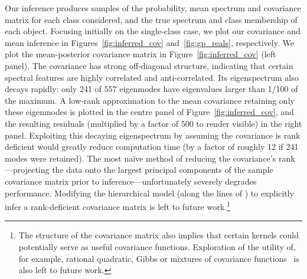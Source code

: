\documentclass[a4paper,fleqn,usenatbib]{mnras}
\begin{document}
Our inference produces samples of the probability, mean spectrum and covariance matrix for each class considered, and the true spectrum and class membership of each object. Focusing initially on the single-class case, we plot our covariance and mean inference in Figures~\ref{fig:inferred_cov} and~\ref{fig:gp_reals}, respectively. We plot the mean-posterior covariance matrix in Figure~\ref{fig:inferred_cov} (left panel). The covariance has strong off-diagonal structure, indicating that certain spectral features are highly correlated and anti-correlated. Its eigenspectrum also decays rapidly: only 241 of 557 eigenmodes have eigenvalues larger than 1/100 of the maximum. A low-rank approximation to the mean covariance retaining only these eigenmodes is plotted in the centre panel of Figure~\ref{fig:inferred_cov}, and the resulting residuals (multiplied by a factor of 500 to render visible) in the right panel. Exploiting this decaying eigenspectrum by assuming the covariance is rank deficient would greatly reduce computation time (by a factor of roughly 12 if 241 modes were retained). The most na\"ive method of reducing the covariance's rank---projecting the data onto the largest principal components of the sample covariance matrix prior to inference---unfortunately severely degrades performance. Modifying the hierarchical model (along the lines of \citet{Zhang_etal:2013}) to explicitly infer a rank-deficient covariance matrix is left to future work.\footnote{The structure of the covariance matrix also implies that certain kernels could potentially serve as useful covariance functions. Exploration of the utility of, for example, rational quadratic, Gibbs or mixtures of covariance functions~\citep{Rasmussen_Williams} is also left to future work.}
\end{document}
